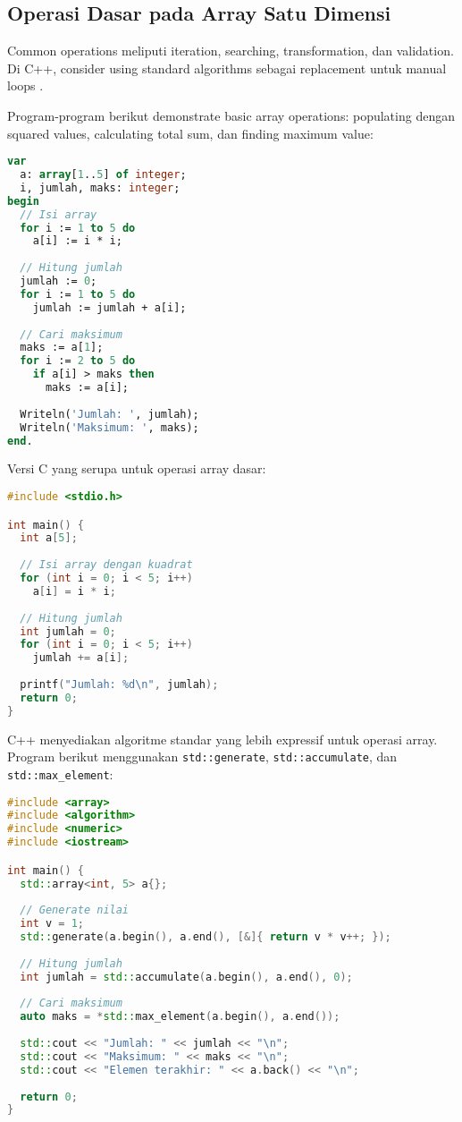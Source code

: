 \documentclass[../main.tex]{subfiles}
\begin{document}
\subsection{Operasi Dasar pada Array Satu Dimensi}
Common operations meliputi iteration, searching, transformation, dan validation. Di C++, consider using standard algorithms sebagai replacement untuk manual loops \parencite{cppreference-algorithm,gnu-c-manual}.

Program-program berikut demonstrate basic array operations: populating dengan squared values, calculating total sum, dan finding maximum value:

\begin{lstlisting}[language=Pascal, caption={Operasi dasar array di Pascal}]
var
  a: array[1..5] of integer;
  i, jumlah, maks: integer;
begin
  // Isi array
  for i := 1 to 5 do
    a[i] := i * i;
    
  // Hitung jumlah
  jumlah := 0;
  for i := 1 to 5 do
    jumlah := jumlah + a[i];
    
  // Cari maksimum
  maks := a[1];
  for i := 2 to 5 do
    if a[i] > maks then
      maks := a[i];
      
  Writeln('Jumlah: ', jumlah);
  Writeln('Maksimum: ', maks);
end.
\end{lstlisting}

Versi C yang serupa untuk operasi array dasar:

\begin{lstlisting}[language=C, caption={Operasi dasar array di C}]
#include <stdio.h>

int main() {
  int a[5];
  
  // Isi array dengan kuadrat
  for (int i = 0; i < 5; i++)
    a[i] = i * i;
  
  // Hitung jumlah
  int jumlah = 0;
  for (int i = 0; i < 5; i++)
    jumlah += a[i];
    
  printf("Jumlah: %d\n", jumlah);
  return 0;
}
\end{lstlisting}

C++ menyediakan algoritme standar yang lebih expressif untuk operasi array. Program berikut menggunakan \texttt{std::generate}, \texttt{std::accumulate}, dan \texttt{std::max\_element}:

\begin{lstlisting}[language=C++, caption={Operasi dengan std::array dan algoritme}]
#include <array>
#include <algorithm>
#include <numeric>
#include <iostream>

int main() {
  std::array<int, 5> a{};
  
  // Generate nilai
  int v = 1;
  std::generate(a.begin(), a.end(), [&]{ return v * v++; });
  
  // Hitung jumlah
  int jumlah = std::accumulate(a.begin(), a.end(), 0);
  
  // Cari maksimum
  auto maks = *std::max_element(a.begin(), a.end());
  
  std::cout << "Jumlah: " << jumlah << "\n";
  std::cout << "Maksimum: " << maks << "\n";
  std::cout << "Elemen terakhir: " << a.back() << "\n";
  
  return 0;
}
\end{lstlisting}
\end{document}
